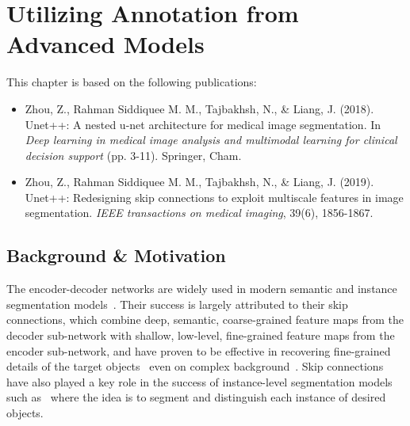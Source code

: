 \chapter{Utilizing Annotation from Advanced Models}
\label{ch4}

This chapter is based on the following publications:
\begin{itemize}
    \item Zhou, Z., Rahman Siddiquee M. M., Tajbakhsh, N., \& Liang, J. (2018). Unet++: A nested u-net architecture for medical image segmentation. In \textit{Deep learning in medical image analysis and multimodal learning for clinical decision support} (pp. 3-11). Springer, Cham.
    \item Zhou, Z., Rahman Siddiquee M. M., Tajbakhsh, N., \& Liang, J. (2019). Unet++: Redesigning skip connections to exploit multiscale features in image segmentation. \textit{IEEE transactions on medical imaging}, 39(6), 1856-1867.
\end{itemize}



\newpage

\section{Background \& Motivation}
\label{ch4:background_motivation}



The encoder-decoder networks are widely used in modern semantic and instance segmentation models~\citep{zhou2017deep,shen2017deep,litjens2017survey,chartrand2017deep,falk2018u,tajbakhsh2020embracing}. Their success is largely attributed to their skip connections, which combine deep, semantic, coarse-grained feature maps from the decoder sub-network with shallow, low-level, fine-grained feature maps from the encoder sub-network, and have proven to be effective in recovering fine-grained details of the target objects~\citep{drozdzal2016importance,he2016deep,huang2017densely} even on complex background~\citep{hariharan2015hypercolumns,lin2017feature}. Skip connections have also played a key role in the success of instance-level segmentation models such as~\citet{he2017mask,hu2018learning} where the idea is to segment and distinguish each instance of desired objects. 

